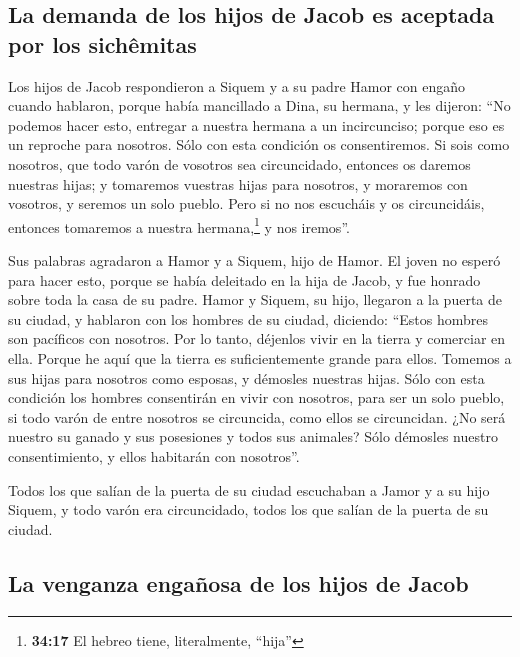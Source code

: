 \hypertarget{la-demanda-de-los-hijos-de-jacob-es-aceptada-por-los-sichuxeamitas}{%
\subsection{La demanda de los hijos de Jacob es aceptada por los
sichêmitas}\label{la-demanda-de-los-hijos-de-jacob-es-aceptada-por-los-sichuxeamitas}}

 Los hijos de Jacob respondieron a Siquem y a su padre
Hamor con engaño cuando hablaron, porque había mancillado a Dina, su
hermana,  y les dijeron: ``No podemos hacer esto,
entregar a nuestra hermana a un incircunciso; porque eso es un reproche
para nosotros.  Sólo con esta condición os consentiremos.
Si sois como nosotros, que todo varón de vosotros sea circuncidado,
 entonces os daremos nuestras hijas; y tomaremos vuestras
hijas para nosotros, y moraremos con vosotros, y seremos un solo pueblo.
 Pero si no nos escucháis y os circuncidáis, entonces
tomaremos a nuestra hermana,\footnote{\textbf{34:17} El hebreo tiene,
  literalmente, ``hija''} y nos iremos''.

 Sus palabras agradaron a Hamor y a Siquem, hijo de
Hamor.  El joven no esperó para hacer esto, porque se
había deleitado en la hija de Jacob, y fue honrado sobre toda la casa de
su padre.  Hamor y Siquem, su hijo, llegaron a la puerta
de su ciudad, y hablaron con los hombres de su ciudad, diciendo:
 ``Estos hombres son pacíficos con nosotros. Por lo
tanto, déjenlos vivir en la tierra y comerciar en ella. Porque he aquí
que la tierra es suficientemente grande para ellos. Tomemos a sus hijas
para nosotros como esposas, y démosles nuestras hijas. 
Sólo con esta condición los hombres consentirán en vivir con nosotros,
para ser un solo pueblo, si todo varón de entre nosotros se circuncida,
como ellos se circuncidan.  ¿No será nuestro su ganado y
sus posesiones y todos sus animales? Sólo démosles nuestro
consentimiento, y ellos habitarán con nosotros''.

 Todos los que salían de la puerta de su ciudad
escuchaban a Jamor y a su hijo Siquem, y todo varón era circuncidado,
todos los que salían de la puerta de su ciudad.

\hypertarget{la-venganza-engauxf1osa-de-los-hijos-de-jacob}{%
\subsection{La venganza engañosa de los hijos de
Jacob}\label{la-venganza-engauxf1osa-de-los-hijos-de-jacob}}

